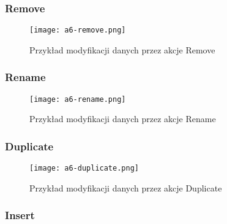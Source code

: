 \subsubsection{Remove}
\begin{figure}[!h]
    \centering \texttt{[image: a6-remove.png]}
    \caption{Przykład modyfikacji danych przez akcje Remove}\label{fig:a6-remove}
\end{figure}
\subsubsection{Rename}
\begin{figure}[!h]
    \centering \texttt{[image: a6-rename.png]}
    \caption{Przykład modyfikacji danych przez akcje Rename}\label{fig:a6-rename}
\end{figure}
\subsubsection{Duplicate}
\begin{figure}[!h]
    \centering \texttt{[image: a6-duplicate.png]}
    \caption{Przykład modyfikacji danych przez akcje Duplicate}\label{fig:a6-duplicate}
\end{figure}
\subsubsection{Insert}
